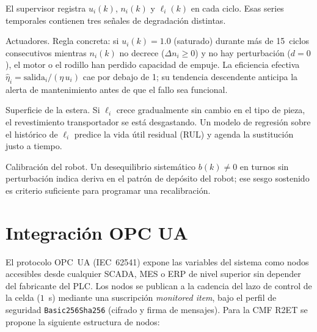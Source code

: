 El supervisor registra $u_i(k)$, $n_i(k)$ y $\ell_i(k)$ en cada ciclo. Esas series temporales contienen tres señales de degradación distintas.

Actuadores. Regla concreta: si $u_i(k)=1.0$ (saturado) durante más de 15~ciclos consecutivos mientras $n_i(k)$ no decrece ($\Delta n_i \geq 0$) y no hay perturbación ($d=0$), el motor o el rodillo han perdido capacidad de empuje. La eficiencia efectiva $\hat{\eta}_i = \text{salida}_i/(\eta\,u_i)$ cae por debajo de 1; su tendencia descendente anticipa la alerta de mantenimiento antes de que el fallo sea funcional.

Superficie de la estera. Si $\ell_i$ crece gradualmente sin cambio en el tipo de pieza, el revestimiento transportador se está desgastando. Un modelo de regresión sobre el histórico de $\ell_i$ predice la vida útil residual (RUL) y agenda la sustitución justo a tiempo.

Calibración del robot. Un desequilibrio sistemático $b(k) \neq 0$ en turnos sin perturbación indica deriva en el patrón de depósito del robot; ese sesgo sostenido es criterio suficiente para programar una recalibración.

\section{Integración OPC UA}

El protocolo OPC~UA (IEC~62541) expone las variables del sistema como nodos accesibles desde cualquier SCADA, MES o ERP de nivel superior sin depender del fabricante del PLC. Los nodos se publican a la cadencia del lazo de control de la celda ($1$~s) mediante una suscripción \emph{monitored item}, bajo el perfil de seguridad \texttt{Basic256Sha256} (cifrado y firma de mensajes). Para la CMF R2ET se propone la siguiente estructura de nodos:

